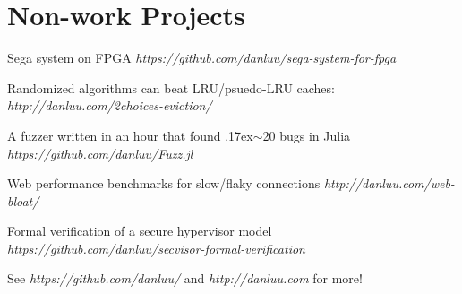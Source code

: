 \documentclass[letterpaper]{scrartcl}
\begin{document}
\section*{Non-work Projects}
\begin{list1}
\item
  \begin{list2}
    \item Sega system on FPGA \hfill \emph{https://github.com/danluu/sega-system-for-fpga}
    \item Randomized algorithms can beat LRU/psuedo-LRU caches:  \hfill \emph{http://danluu.com/2choices-eviction/}
    \item A fuzzer written in an hour that found {\raise.17ex\hbox{$\scriptstyle\mathtt{\sim}$}}20 bugs in Julia \hfill \emph{https://github.com/danluu/Fuzz.jl}
    \item Web performance benchmarks for slow/flaky connections \hfill \emph{http://danluu.com/web-bloat/}
    \item Formal verification of a secure hypervisor model \hfill \emph{https://github.com/danluu/secvisor-formal-verification}
    \item See \emph{https://github.com/danluu/} and \emph{http://danluu.com} for more!
  \end{list2}
\end{list1}


%
%
\end{document}
